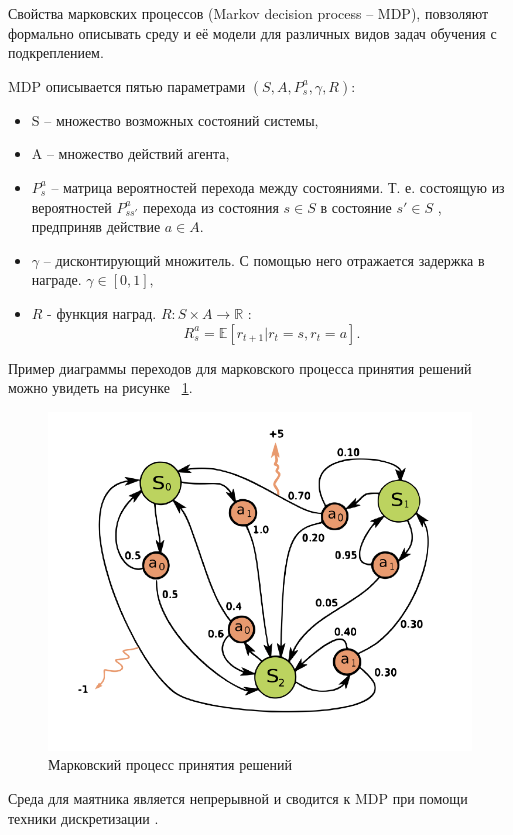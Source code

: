  Свойства марковских процессов (Markov decision process – MDP), повзоляют формально описывать среду и её модели для различных видов задач обучения с подкреплением.

MDP описывается пятью параметрами $(S, A, {P^a_s},\gamma, R)$: 
\begin{itemize}
    \item S -- множество возможных состояний системы,
    \item A --  множество действий агента,
    \item $P_s^a$ -- матрица вероятностей перехода между состояниями. Т. е. состоящую из вероятностей $P^a_{ss'}$ перехода из состояния $s\in S$  в состояние $s' \in S$ , предприняв действие $a \in A$.  
    \item $\gamma$ -- дисконтирующий множитель. С помощью него отражается задержка в награде. $\gamma \in [0, 1],$
    \item $R$ - функция наград. $R : S \times A \to \mathbb{R}$ :
    $$R_s^a = \mathbb{E} [ r_{t+1} | r_t = s, r_t = a].$$
\end{itemize}

Пример диаграммы переходов для марковского процесса принятия решений можно увидеть на рисунке ~\ref{fig:mdp-pic}. \newpage

\begin{figure}[h]
	\centering
	\includegraphics[scale=0.6]{mdp_pic.png}
	\caption {Марковский процесс принятия решений}	
	\label{fig:mdp-pic}
\end{figure}


Среда для маятника является непрерывной и сводится к MDP при помощи техники дискретизации \cite{rl2}.

